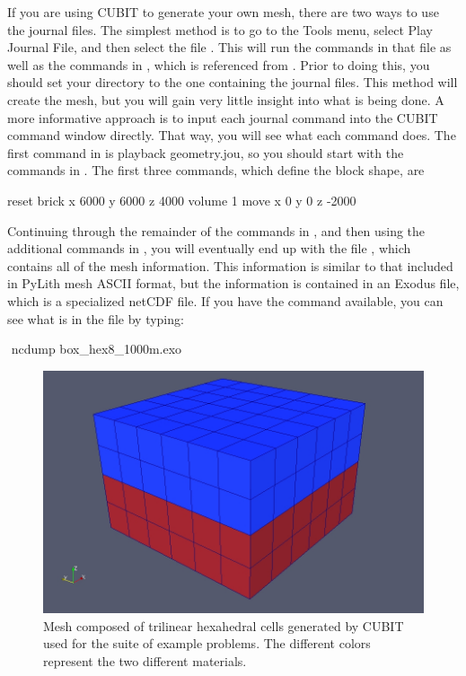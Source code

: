 If you are using CUBIT to generate your own mesh, there are two ways
to use the journal files. The simplest method is to go to the\textsf{
  Tools} menu, select \textsf{Play Journal File}, and then select the
file . This will run the commands in
that file as well as the commands in , which is
referenced from . Prior to doing
this, you should set your directory to the one containing the journal
files. This method will create the mesh, but you will gain very little
insight into what is being done. A more informative approach is to
input each journal command into the CUBIT command window directly.
That way, you will see what each command does. The first command in
 is \textsf{playback geometry.jou}, so
you should start with the commands in . The
first three commands, which define the block shape, are
\begin{shell}
reset
brick x 6000 y 6000 z 4000
volume 1 move x 0 y 0 z -2000
\end{shell}
Continuing through the remainder of the commands in ,
and then using the additional commands in ,
you will eventually end up with the file ,
which contains all of the mesh information. This information is similar
to that included in PyLith mesh ASCII format, but the information
is contained in an Exodus file, which is a specialized netCDF file.
If you have the  command available, you can see what
is in the file by typing:
\begin{shell}
$$ ncdump box_hex8_1000m.exo
\end{shell}

\begin{figure}
  \includegraphics[scale=0.33]{examples/figs/3dhex8_mesh}
  \caption{Mesh composed of trilinear hexahedral cells generated by CUBIT used
    for the suite of example problems. The different colors represent
    the two different materials.}
  \label{fig:3dhex8:mesh}
\end{figure}


